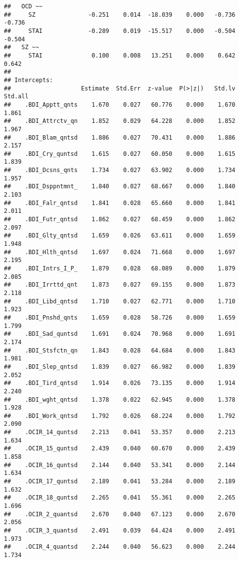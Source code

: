 \documentclass[]{article}
\begin{document}
\begin{verbatim}
##   OCD ~~                                                                
##     SZ               -0.251    0.014  -18.039    0.000   -0.736   -0.736
##     STAI             -0.289    0.019  -15.517    0.000   -0.504   -0.504
##   SZ ~~                                                                 
##     STAI              0.100    0.008   13.251    0.000    0.642    0.642
## 
## Intercepts:
##                    Estimate  Std.Err  z-value  P(>|z|)   Std.lv  Std.all
##    .BDI_Apptt_qnts    1.670    0.027   60.776    0.000    1.670    1.861
##    .BDI_Attrctv_qn    1.852    0.029   64.228    0.000    1.852    1.967
##    .BDI_Blam_qntsd    1.886    0.027   70.431    0.000    1.886    2.157
##    .BDI_Cry_quntsd    1.615    0.027   60.050    0.000    1.615    1.839
##    .BDI_Dcsns_qnts    1.734    0.027   63.902    0.000    1.734    1.957
##    .BDI_Dsppntmnt_    1.840    0.027   68.667    0.000    1.840    2.103
##    .BDI_Falr_qntsd    1.841    0.028   65.660    0.000    1.841    2.011
##    .BDI_Futr_qntsd    1.862    0.027   68.459    0.000    1.862    2.097
##    .BDI_Glty_qntsd    1.659    0.026   63.611    0.000    1.659    1.948
##    .BDI_Hlth_qntsd    1.697    0.024   71.668    0.000    1.697    2.195
##    .BDI_Intrs_I_P_    1.879    0.028   68.089    0.000    1.879    2.085
##    .BDI_Irrttd_qnt    1.873    0.027   69.155    0.000    1.873    2.118
##    .BDI_Libd_qntsd    1.710    0.027   62.771    0.000    1.710    1.923
##    .BDI_Pnshd_qnts    1.659    0.028   58.726    0.000    1.659    1.799
##    .BDI_Sad_quntsd    1.691    0.024   70.968    0.000    1.691    2.174
##    .BDI_Stsfctn_qn    1.843    0.028   64.684    0.000    1.843    1.981
##    .BDI_Slep_qntsd    1.839    0.027   66.982    0.000    1.839    2.052
##    .BDI_Tird_qntsd    1.914    0.026   73.135    0.000    1.914    2.240
##    .BDI_wght_qntsd    1.378    0.022   62.945    0.000    1.378    1.928
##    .BDI_Work_qntsd    1.792    0.026   68.224    0.000    1.792    2.090
##    .OCIR_14_quntsd    2.213    0.041   53.357    0.000    2.213    1.634
##    .OCIR_15_quntsd    2.439    0.040   60.670    0.000    2.439    1.858
##    .OCIR_16_quntsd    2.144    0.040   53.341    0.000    2.144    1.634
##    .OCIR_17_quntsd    2.189    0.041   53.284    0.000    2.189    1.632
##    .OCIR_18_quntsd    2.265    0.041   55.361    0.000    2.265    1.696
##    .OCIR_2_quantsd    2.670    0.040   67.123    0.000    2.670    2.056
##    .OCIR_3_quantsd    2.491    0.039   64.424    0.000    2.491    1.973
##    .OCIR_4_quantsd    2.244    0.040   56.623    0.000    2.244    1.734

\end{verbatim}
\end{document}
